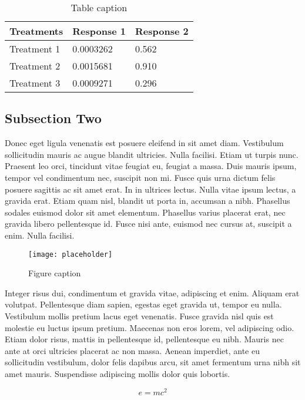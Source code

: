 \documentclass[preprint,12pt,times]{elsarticle}
\begin{document}
	\begin{table}[h]
		\centering
		\begin{tabular}{l l l}
			\hline
			\textbf{Treatments} & \textbf{Response 1} & \textbf{Response 2}\\
			\hline
			Treatment 1 & 0.0003262 & 0.562 \\
			Treatment 2 & 0.0015681 & 0.910 \\
			Treatment 3 & 0.0009271 & 0.296 \\
			\hline
		\end{tabular}
		\caption{Table caption}
	\end{table}
	
	\subsection{Subsection Two}
	
	Donec eget ligula venenatis est posuere eleifend in sit amet diam. Vestibulum sollicitudin mauris ac augue blandit ultricies. Nulla facilisi. Etiam ut turpis nunc. Praesent leo orci, tincidunt vitae feugiat eu, feugiat a massa. Duis mauris ipsum, tempor vel condimentum nec, suscipit non mi. Fusce quis urna dictum felis posuere sagittis ac sit amet erat. In in ultrices lectus. Nulla vitae ipsum lectus, a gravida erat. Etiam quam nisl, blandit ut porta in, accumsan a nibh. Phasellus sodales euismod dolor sit amet elementum. Phasellus varius placerat erat, nec gravida libero pellentesque id. Fusce nisi ante, euismod nec cursus at, suscipit a enim. Nulla facilisi.
	
	\begin{figure}[h]
		\centering\texttt{[image: placeholder]}
		\caption{Figure caption}
	\end{figure}
	
	Integer risus dui, condimentum et gravida vitae, adipiscing et enim. Aliquam erat volutpat. Pellentesque diam sapien, egestas eget gravida ut, tempor eu nulla. Vestibulum mollis pretium lacus eget venenatis. Fusce gravida nisl quis est molestie eu luctus ipsum pretium. Maecenas non eros lorem, vel adipiscing odio. Etiam dolor risus, mattis in pellentesque id, pellentesque eu nibh. Mauris nec ante at orci ultricies placerat ac non massa. Aenean imperdiet, ante eu sollicitudin vestibulum, dolor felis dapibus arcu, sit amet fermentum urna nibh sit amet mauris. Suspendisse adipiscing mollis dolor quis lobortis.
	
	\begin{equation}
	\label{eq:emc}
	e = mc^2
	\end{equation}
	
\end{document}
